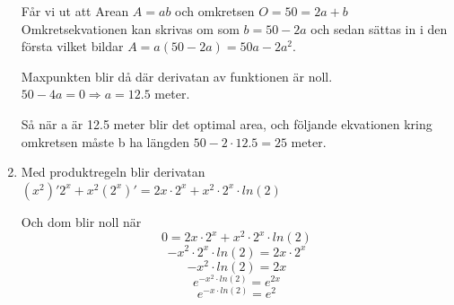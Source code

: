 \documentclass[a4paper,12pt]{article}
\begin{document}
\begin{enumerate}
    Får vi ut att Arean $A=ab$ och omkretsen $O=50=2a+b$
    Omkretsekvationen kan skrivas om som $b=50-2a$ och sedan 
    sättas in i den första vilket bildar $A=a(50-2a)=50a-2a^2$.

    Maxpunkten blir då där derivatan av funktionen är noll.
    $50-4a=0\Rightarrow a=12.5$ meter.

    Så när a är 12.5 meter blir det optimal area, och följande 
    ekvationen kring omkretsen måste b ha längden $50-2\cdot 12.5=25$ meter.

    \item 
    Med produktregeln blir derivatan
    $(x^2)'2^x+x^2(2^x)'=2x\cdot 2^x + x^2\cdot 2^x\cdot ln(2)$

    Och dom blir noll när 
    $$0=2x\cdot 2^x + x^2\cdot 2^x\cdot ln(2)$$
    $$-x^2\cdot 2^x\cdot ln(2)=2x\cdot 2^x $$
    $$-x^2\cdot ln(2)=2x$$
    $$e^{-x^2\cdot ln(2)}=e^{2x}$$
    $$e^{-x\cdot ln(2)}=e^{2}$$


\end{enumerate}
\end{document}
